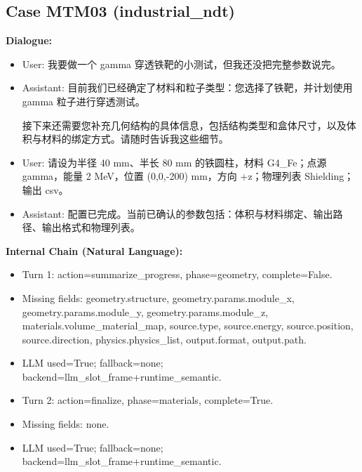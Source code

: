\documentclass[11pt]{ctexart}
\begin{document}
\subsection{Case MTM03 (industrial\_ndt)}
\textbf{Dialogue:}
\begin{itemize}
\item User: 我要做一个 gamma 穿透铁靶的小测试，但我还没把完整参数说完。
\item Assistant: 目前我们已经确定了材料和粒子类型：您选择了铁靶，并计划使用 gamma 粒子进行穿透测试。

接下来还需要您补充几何结构的具体信息，包括结构类型和盒体尺寸，以及体积与材料的绑定方式。请随时告诉我这些细节。
\item User: 请设为半径 40 mm、半长 80 mm 的铁圆柱，材料 G4\_Fe；点源 gamma，能量 2 MeV，位置 (0,0,-200) mm，方向 +z；物理列表 Shielding；输出 csv。
\item Assistant: 配置已完成。当前已确认的参数包括：体积与材料绑定、输出路径、输出格式和物理列表。
\end{itemize}
\textbf{Internal Chain (Natural Language):}
\begin{itemize}
\item Turn 1: action=summarize\_progress, phase=geometry, complete=False.
\item Missing fields: geometry.structure, geometry.params.module\_x, geometry.params.module\_y, geometry.params.module\_z, materials.volume\_material\_map, source.type, source.energy, source.position, source.direction, physics.physics\_list, output.format, output.path.
\item LLM used=True; fallback=none; backend=llm\_slot\_frame+runtime\_semantic.
\item Turn 2: action=finalize, phase=materials, complete=True.
\item Missing fields: none.
\item LLM used=True; fallback=none; backend=llm\_slot\_frame+runtime\_semantic.
\end{itemize}
\end{document}
